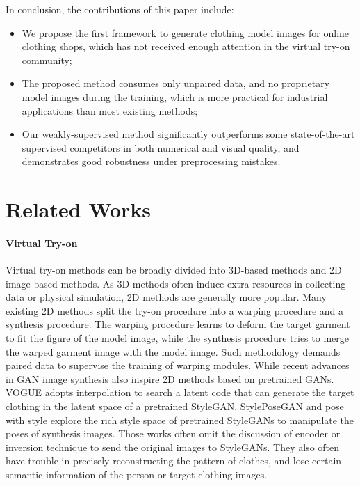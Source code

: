 \documentclass[10pt,twocolumn,letterpaper]{article}
\begin{document}
In conclusion, the contributions of this paper include:
\begin{itemize}
    \item We propose the first framework to generate clothing model images for online clothing shops, which has not received enough attention in the virtual try-on community;
    \item The proposed method consumes only unpaired data, and no proprietary model images during the training, which is more practical for industrial applications than most existing methods;
    \item Our weakly-supervised method significantly outperforms some state-of-the-art supervised competitors in both numerical and visual quality, and demonstrates good robustness under preprocessing mistakes.
\end{itemize}






\section{Related Works}
\paragraph{Virtual Try-on}
Virtual try-on methods can be broadly divided into 3D-based methods \cite{guan2012drape,patel2020tailornet,brouet2012design,pons2017clothcap,patel2020tailornet,rohmer2010animation} and 2D image-based \cite{wang2018toward,han2018viton,choi2021viton,jae2019viton,yu2019vtnfp,yang2020towards,dong2019towards,han2019clothflow} methods. As 3D methods often induce extra resources in collecting data or physical simulation, 2D methods are generally more popular. Many existing 2D methods \cite{han2018viton,jae2019viton,ge2021parser,choi2021viton,dong2019fw,han2019clothflow} split the try-on procedure into a warping procedure and a synthesis procedure. The warping procedure learns to deform the target garment to fit the figure of the model image, while the synthesis procedure tries to merge the warped garment image with the model image. Such methodology demands paired data \cite{han2018viton} to supervise the training of warping modules. While recent advances in GAN image synthesis also inspire 2D methods based on pretrained GANs. VOGUE \cite{lewis2021tryongan,lewis2021vogue} adopts interpolation to search a latent code that can generate the target clothing in the latent space of a pretrained StyleGAN. StylePoseGAN \cite{sarkar2021style} and pose with style \cite{albahar2021pose} explore the rich style space of pretrained StyleGANs to manipulate the poses of synthesis images. Those works often omit the discussion of encoder or inversion technique to send the original images to StyleGANs. They also often have trouble in precisely reconstructing the pattern of clothes, and lose certain semantic information of the person or target clothing images. 
\end{document}
